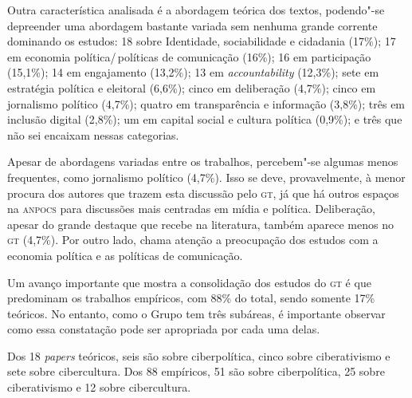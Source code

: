 {Outra característica analisada é a abordagem teórica dos textos,
podendo"-se depreender uma abordagem bastante variada sem nenhuma grande
corrente dominando os estudos: 18 sobre Identidade, sociabilidade e cidadania (17\%); 17 em economia política/\,políticas de comunicação (16\%); 16 em participação (15,1\%); 14 em engajamento (13,2\%); 13 em \textit{accountability} (12,3\%); sete em estratégia política e eleitoral (6,6\%); cinco em deliberação (4,7\%); cinco em jornalismo político (4,7\%); quatro em transparência e informação (3,8\%); três em inclusão digital (2,8\%); um em capital social e cultura política (0,9\%); e três que não sei encaixam nessas categorias.

Apesar de abordagens variadas entre os trabalhos, percebem"-se algumas
menos frequentes, como jornalismo político (4,7\%). Isso se deve,
provavelmente, à menor procura dos autores que trazem esta
discussão pelo \textsc{gt}, já que há outros espaços na \textsc{\textsc{anpocs}} para discussões
mais centradas em mídia e política. Deliberação, apesar do grande
destaque que recebe na literatura, também aparece menos no \textsc{gt} (4,7\%).
Por outro lado, chama atenção a preocupação dos estudos com a economia
política e as políticas de comunicação.

Um avanço importante que mostra a consolidação dos estudos do \textsc{gt} é que
predominam os trabalhos empíricos, com 88\% do total, sendo somente 17\%
teóricos. No entanto, como o Grupo tem três subáreas, é importante
observar como essa constatação pode ser apropriada por cada uma delas.

Dos 18 \textit{papers} teóricos, seis são sobre ciberpolítica, cinco sobre ciberativismo e sete sobre cibercultura. Dos 88 empíricos, 51 são sobre ciberpolítica, 25 sobre ciberativismo e 12 sobre cibercultura.

}
